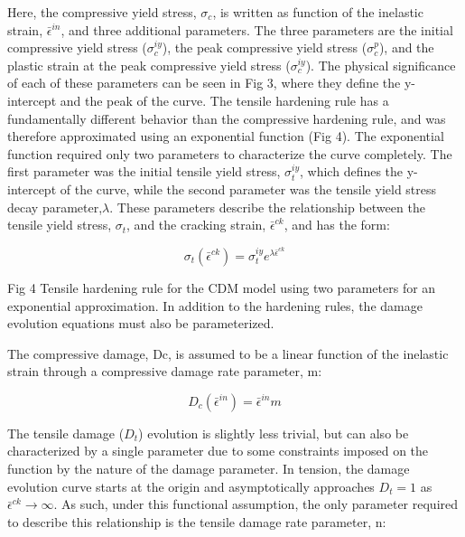 Here, the compressive yield stress, $\sigma_{c}$, is written as function
of the inelastic strain, $\bar{\epsilon}^{in}$, and three additional
parameters. The three parameters are the initial compressive yield
stress ($\sigma_{c}^{iy}$), the peak compressive yield stress ($\sigma_{c}^{p}$),
and the plastic strain at the peak compressive yield stress ($\sigma_{c}^{iy}$).
The physical significance of each of these parameters can be seen
in Fig 3, where they define the y-intercept and the peak of the curve.
The tensile hardening rule has a fundamentally different behavior
than the compressive hardening rule, and was therefore approximated
using an exponential function (Fig 4). The exponential function required
only two parameters to characterize the curve completely. The first
parameter was the initial tensile yield stress, $\sigma_{t}^{iy}$,
which defines the y-intercept of the curve, while the second parameter
was the tensile yield stress decay parameter,$\lambda$. These parameters
describe the relationship between the tensile yield stress, $\sigma_{t}$,
and the cracking strain, $\bar{\epsilon}^{ck}$, and has the form:

\begin{equation}
\sigma_{t}\left(\bar{\epsilon}^{ck}\right)=\sigma_{t}^{iy}e^{\lambda\bar{\epsilon}^{ck}}\label{eqn:param2}
\end{equation}


Fig 4 Tensile hardening rule for the CDM model using two parameters
for an exponential approximation. In addition to the hardening rules,
the damage evolution equations must also be parameterized.

The compressive damage, Dc, is assumed to be a linear function of
the inelastic strain through a compressive damage rate parameter,
m:

\begin{equation}
D_{c}\left(\bar{\epsilon}^{in}\right)=\bar{\epsilon}^{in}m\label{eqn:param3}
\end{equation}


The tensile damage ($D_{t}$) evolution is slightly less trivial,
but can also be characterized by a single parameter due to some constraints
imposed on the function by the nature of the damage parameter. In
tension, the damage evolution curve starts at the origin and asymptotically
approaches $D_{t}=1$ as $\bar{\epsilon}^{ck}\rightarrow\infty$.
As such, under this functional assumption, the only parameter required
to describe this relationship is the tensile damage rate parameter,
n:

